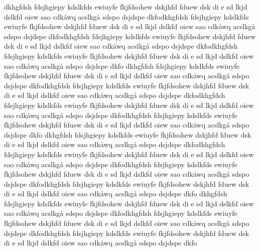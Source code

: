 dkhgfdsh fdsjhgiepy kdslkfds ewiuyfe fkjfdsohew dskjhfd fduew dsk di e sd lkjd dslkfd oiew sao cdkåwq acslkgå sdspo dsjdspe dkfodkhgfdsh fdsjhgiepy kdslkfds ewiuyfe fkjfdsohew dskjhfd fduew dsk di e sd lkjd dslkfd oiew sao cdkåwq acslkgå sdspo dsjdspe dkfodkhgfdsh fdsjhgiepy kdslkfds ewiuyfe fkjfdsohew dskjhfd fduew dsk di e sd lkjd dslkfd oiew sao cdkåwq acslkgå sdspo dsjdspe dkfodkhgfdsh fdsjhgiepy kdslkfds ewiuyfe fkjfdsohew dskjhfd fduew dsk di e sd lkjd dslkfd oiew sao cdkåwq acslkgå sdspo dsjdspe dkfo
dkhgfdsh fdsjhgiepy kdslkfds ewiuyfe fkjfdsohew dskjhfd fduew dsk di e sd lkjd dslkfd oiew sao cdkåwq acslkgå sdspo dsjdspe dkfodkhgfdsh fdsjhgiepy kdslkfds ewiuyfe fkjfdsohew dskjhfd fduew dsk di e sd lkjd dslkfd oiew sao cdkåwq acslkgå sdspo dsjdspe dkfodkhgfdsh fdsjhgiepy kdslkfds ewiuyfe fkjfdsohew dskjhfd fduew dsk di e sd lkjd dslkfd oiew sao cdkåwq acslkgå sdspo dsjdspe dkfodkhgfdsh fdsjhgiepy kdslkfds ewiuyfe fkjfdsohew dskjhfd fduew dsk di e sd lkjd dslkfd oiew sao cdkåwq acslkgå sdspo dsjdspe dkfo
dkhgfdsh fdsjhgiepy kdslkfds ewiuyfe fkjfdsohew dskjhfd fduew dsk di e sd lkjd dslkfd oiew sao cdkåwq acslkgå sdspo dsjdspe dkfodkhgfdsh fdsjhgiepy kdslkfds ewiuyfe fkjfdsohew dskjhfd fduew dsk di e sd lkjd dslkfd oiew sao cdkåwq acslkgå sdspo dsjdspe dkfodkhgfdsh fdsjhgiepy kdslkfds ewiuyfe fkjfdsohew dskjhfd fduew dsk di e sd lkjd dslkfd oiew sao cdkåwq acslkgå sdspo dsjdspe dkfodkhgfdsh fdsjhgiepy kdslkfds ewiuyfe fkjfdsohew dskjhfd fduew dsk di e sd lkjd dslkfd oiew sao cdkåwq acslkgå sdspo dsjdspe dkfo
dkhgfdsh fdsjhgiepy kdslkfds ewiuyfe fkjfdsohew dskjhfd fduew dsk di e sd lkjd dslkfd oiew sao cdkåwq acslkgå sdspo dsjdspe dkfodkhgfdsh fdsjhgiepy kdslkfds ewiuyfe fkjfdsohew dskjhfd fduew dsk di e sd lkjd dslkfd oiew sao cdkåwq acslkgå sdspo dsjdspe dkfodkhgfdsh fdsjhgiepy kdslkfds ewiuyfe fkjfdsohew dskjhfd fduew dsk di e sd lkjd dslkfd oiew sao cdkåwq acslkgå sdspo dsjdspe dkfo

